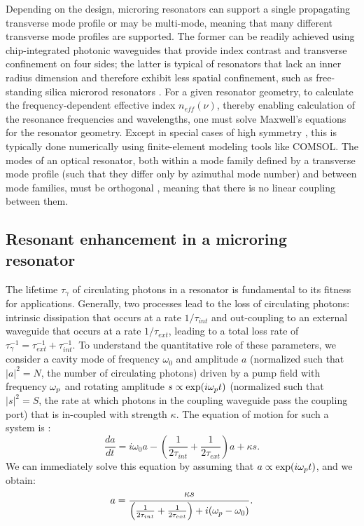 	 Depending on the design, microring resonators can support a single propagating transverse mode profile or may be multi-mode, meaning that many different transverse mode profiles are supported. The former can be readily achieved using chip-integrated photonic waveguides that provide index contrast and transverse confinement on four sides; the latter is typical of resonators that lack an inner radius dimension and therefore exhibit less spatial confinement, such as free-standing silica microrod resonators \cite{DelHaye2013}. For a given resonator geometry, to calculate the frequency-dependent effective index $n_{eff}(\nu)$, thereby enabling calculation of the resonance frequencies and wavelengths, one must solve Maxwell's equations for the resonator geometry. Except in special cases of high symmetry \cite{Oraevsky2002}, this is typically done numerically using finite-element modeling tools like COMSOL. The modes of an optical resonator, both within a mode family defined by a transverse mode profile (such that they differ only by azimuthal mode number) and between mode families, must be orthogonal \cite{Haus1984}, meaning that there is no linear coupling between them.

\subsection{Resonant enhancement in a microring resonator}
 The lifetime $\tau_\gamma$ of circulating photons in a resonator is fundamental to its fitness for applications. Generally, two processes lead to the loss of circulating photons: intrinsic dissipation that occurs at a rate $1/\tau_{int}$ and out-coupling to an external waveguide that occurs at a rate $1/\tau_{ext}$, leading to a total loss rate of $\tau_\gamma^{-1}=\tau_{ext}^{-1}+\tau_{int}^{-1}$. To understand the quantitative role of these parameters, we consider a cavity mode of frequency $\omega_0$ and amplitude $a$ (normalized such that $|a|^2=N$, the number of circulating photons) driven by a pump field with frequency $\omega_{p}$ and rotating amplitude $s\propto\exp(i\omega_{p} t)$ (normalized such that $|s|^2=S$, the rate at which photons in the coupling waveguide pass the coupling port) that is in-coupled with strength $\kappa$. The equation of motion for such a system is \cite{Haus1984}:
 \begin{equation}
 \frac{d a}{d t}=i\omega_0 a-\left(\frac{1}{2\tau_{int}}+\frac{1}{2\tau_{ext}}\right)a+\kappa s. \label{eq:coupledmotion}
 \end{equation}
 We can immediately solve this equation by assuming that $a\propto\exp(i\omega_{p} t)$, and we obtain:
 \begin{equation}
 a=\frac{\kappa s}{\left(\frac{1}{2\tau_{int}}+\frac{1}{2\tau_{ext}}\right)+i(\omega_{p}-\omega_0)}. \label{eq:coupledsoln}
 \end{equation}
 
